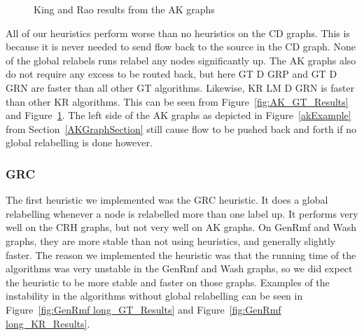 \begin{figure}[h]
\caption{King and Rao results from the AK graphs}
\label{fig:AK_KR_Results}
\end{figure}


All of our heuristics perform worse than no heuristics on the CD graphs. This is because it is never needed to send flow back to the source in the CD graph.
None of the global relabels runs relabel any nodes significantly up. 
The AK graphs also do not require any excess to be routed back, but here GT D GRP and GT D GRN are faster than all other GT algorithms.
Likewise, KR LM D GRN is faster than other KR algorithms. This can be seen from Figure~\ref{fig:AK_GT_Results} and Figure~\ref{fig:AK_KR_Results}.
The left side of the AK graphs as depicted in Figure~\ref{akExample} from Section~\ref{AKGraphSection} still cause flow to be pushed back and forth if no global relabelling is done however.


\subsubsection{GRC}

The first heuristic we implemented was the GRC heuristic. It does a global relabelling whenever a node is relabelled more than one label up.
It performs very well on the CRH graphs, but not very well on AK graphs. On GenRmf and Wash graphs, they are more stable than not using heuristics, and generally slightly faster.
The reason we implemented the heuristic was that the running time of the algorithms was very unstable in the GenRmf and Wash graphs, so we did expect the heuristic to be more stable and faster on those graphs.
Examples of the instability in the algorithms without global relabelling can be seen in Figure~\ref{fig:GenRmf long_GT_Results} and Figure~\ref{fig:GenRmf long_KR_Results}.

